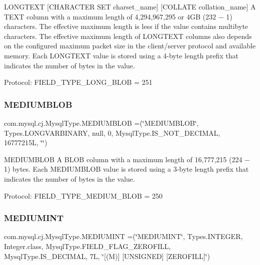 L\+O\+N\+G\+T\+E\+XT \mbox{[}C\+H\+A\+R\+A\+C\+T\+ER S\+ET charset\+\_\+name\mbox{]} \mbox{[}C\+O\+L\+L\+A\+TE collation\+\_\+name\mbox{]} A T\+E\+XT column with a maximum length of 4,294,967,295 or 4\+GB (232 − 1) characters. The effective maximum length is less if the value contains multibyte characters. The effective maximum length of L\+O\+N\+G\+T\+E\+XT columns also depends on the configured maximum packet size in the client/server protocol and available memory. Each L\+O\+N\+G\+T\+E\+XT value is stored using a 4-\/byte length prefix that indicates the number of bytes in the value.

Protocol\+: F\+I\+E\+L\+D\+\_\+\+T\+Y\+P\+E\+\_\+\+L\+O\+N\+G\+\_\+\+B\+L\+OB = 251 \mbox{\label{enumcom_1_1mysql_1_1cj_1_1_mysql_type_a7a690573bfaf820db73489978040f19d}} 
\subsubsection{\texorpdfstring{M\+E\+D\+I\+U\+M\+B\+L\+OB}{MEDIUMBLOB}}
{\footnotesize\ttfamily com.\+mysql.\+cj.\+Mysql\+Type.\+M\+E\+D\+I\+U\+M\+B\+L\+OB =(\char`\"{}M\+E\+D\+I\+U\+M\+B\+L\+OB\char`\"{}, Types.\+L\+O\+N\+G\+V\+A\+R\+B\+I\+N\+A\+RY, null, 0, Mysql\+Type.\+I\+S\+\_\+\+N\+O\+T\+\_\+\+D\+E\+C\+I\+M\+AL, 16777215\+L, \char`\"{}\char`\"{})}

M\+E\+D\+I\+U\+M\+B\+L\+OB A B\+L\+OB column with a maximum length of 16,777,215 (224 − 1) bytes. Each M\+E\+D\+I\+U\+M\+B\+L\+OB value is stored using a 3-\/byte length prefix that indicates the number of bytes in the value.

Protocol\+: F\+I\+E\+L\+D\+\_\+\+T\+Y\+P\+E\+\_\+\+M\+E\+D\+I\+U\+M\+\_\+\+B\+L\+OB = 250 \mbox{\label{enumcom_1_1mysql_1_1cj_1_1_mysql_type_ab95197c592f1fbd01abed94679b373ca}} 
\subsubsection{\texorpdfstring{M\+E\+D\+I\+U\+M\+I\+NT}{MEDIUMINT}}
{\footnotesize\ttfamily com.\+mysql.\+cj.\+Mysql\+Type.\+M\+E\+D\+I\+U\+M\+I\+NT =(\char`\"{}M\+E\+D\+I\+U\+M\+I\+NT\char`\"{}, Types.\+I\+N\+T\+E\+G\+ER, Integer.\+class, Mysql\+Type.\+F\+I\+E\+L\+D\+\_\+\+F\+L\+A\+G\+\_\+\+Z\+E\+R\+O\+F\+I\+LL, Mysql\+Type.\+I\+S\+\_\+\+D\+E\+C\+I\+M\+AL, 7\+L, \char`\"{}\mbox{[}(\+M)\mbox{]} \mbox{[}\+U\+N\+S\+I\+G\+N\+E\+D\mbox{]} \mbox{[}\+Z\+E\+R\+O\+F\+I\+L\+L\mbox{]}\char`\"{})}

